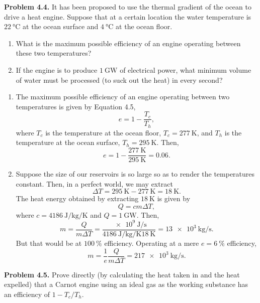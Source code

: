 \documentclass[a4paper, 12pt]{config/homework}
\begin{document}
\pagebreak\noindent
\textbf{Problem 4.4.} It has been proposed to use the thermal gradient of the ocean to drive a heat engine. Suppose that at a certain location the water temperature is \(\qty{22}{\celsius}\) at the ocean surface and \(\qty{4}{\celsius}\) at the ocean floor.
\begin{enumerate}[label=\textbf{(\alph*)}]
\item What is the maximum possible efficiency of an engine operating between these two temperatures?
\item If the engine is to produce \(\qty{1}{\giga\watt}\) of electrical power, what minimum volume of water must be processed (to suck out the heat) in every second?
\end{enumerate}
\begin{enumerate}[label=\textbf{(\alph*)}]
\bigskip
\item The maximum possible efficiency of an engine operating between two temperatures is given by Equation 4.5,
\[e = 1 - \frac{T_c}{T_h},\]
where \(T_c\) is the temperature at the ocean floor, \(T_c = \qty{277}{\kelvin}\), and \(T_h\) is the temperature at the ocean surface, \(T_h=\qty{295}{\kelvin}\). Then,
\[e = 1 - \frac{\qty{277}{\kelvin}}{\qty{295}{\kelvin}} = 0.06.\]
\bigskip
\item Suppose the size of our reservoirs is so large so as to render the temperatures constant. Then, in a perfect world, we may extract
\[\Delta T = \qty{295}{\kelvin} - \qty{277}{\kelvin} = \qty{18}{\kelvin}.\]
The heat energy obtained by extracting \(\qty{18}{\kelvin}\) is given by
\[Q = cm\Delta T,\]
where \(c = \qty{4186}{\joule\per\kg\per\kelvin}\) and \(Q=\qty{1}{\giga\watt}\). Then,
\[m = \frac{Q}{m\Delta T} = \frac{\qty{e9}{\joule\per\second}}{\qty{4186}{\joule\per\kg\per\kelvin}\qty{18}{\kelvin}} = \qty{13e3}{\kg\per\second}.\]
But that would be at \(\qty{100}{\percent}\) efficiency. Operating at a mere \(e=\qty{6}{\percent}\) efficiency,
\[m = \frac{1}{e}\frac{Q}{m\Delta T} = \qty{217e3}{\kg\per\second}.\]
\end{enumerate}

\pagebreak\noindent
\textbf{Problem 4.5.} Prove directly (by calculating the heat taken in and the heat expelled) that a Carnot engine using an ideal gas as the working substance has an efficiency of \(1 - T_c/T_h\).
\end{document}
